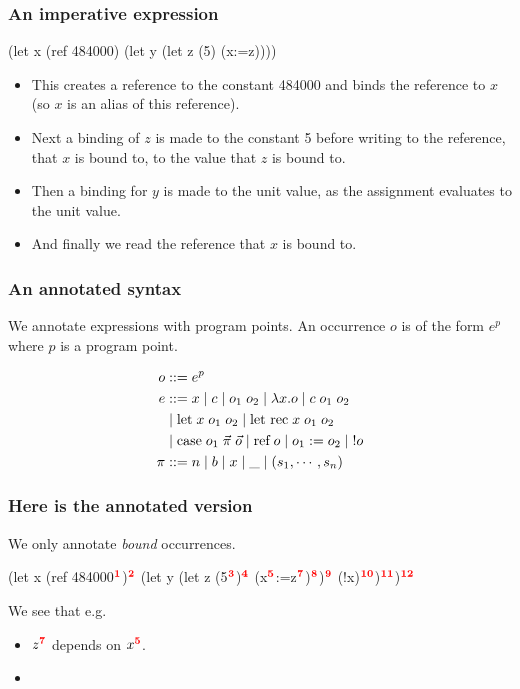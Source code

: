 \documentclass{beamer}
\begin{document}
\begin{frame}[fragile]
  \frametitle{An imperative expression}
  
\begin{rescript}
       (let x (ref 484000)
        (let y (let z (5) (x:=z))))
\end{rescript}

\begin{itemize}
\item<1->This creates a reference to the constant 484000 and binds the reference to
  $x$ (so $x$ is an alias of this reference).
\item<2-> Next a binding of $z$ is made
to the constant 5 before writing to the reference, that $x$ is bound to, 
to the value that $z$ is bound to.
\item<3-> Then a binding for $y$ is made to the unit value,
  as the assignment evaluates to the unit value.
\item<4-> And finally we read the reference that $x$ is bound to.
\end{itemize}

\end{frame}

\begin{frame}
  \frametitle{An annotated syntax}

  We annotate expressions with program points. An occurrence $o$ is of the form $e^p$ where $p$ is a program point.
  
\begin{align*}
o &::= e^p \\
e &::= x \mid c \mid o_1\;o_2 \mid \lambda x.o \mid c \; o_1 \; o_2\\
			& \mid \mbox{let} \; x \; o_1 \; o_2 \mid
                   \mbox{let rec} \; x \; o_1 \; o_2 \\
  & \mid \mbox{case}
                   \; o_1 \; \vec{\pi} \; \vec{o} \mid  \textrm{ref} \; o \mid o_1 := o_2 \mid \; !o\\
\pi &::= n \mid b \mid x \mid \_  \mid
                                (s_1,\cdots,s_n)
\end{align*}

\end{frame}
\begin{frame}[fragile]
  \frametitle{Here is the annotated version}

    We only annotate \emph{bound} occurrences.

  \begin{rescript}
   (let x (ref 484000$\mathbf{\textcolor{red}{^{1}}}$)$\mathbf{\textcolor{red}{^{2}}}$
     (let y (let z (5$\mathbf{\textcolor{red}{^{3}}}$)$\mathbf{\textcolor{red}{^{4}}}$
        (x$\mathbf{\textcolor{red}{^{5}}}$:=z$\mathbf{\textcolor{red}{^{7}}}$)$\mathbf{\textcolor{red}{^{8}}}$)$\mathbf{\textcolor{red}{^{9}}}$ (!x)$\mathbf{\textcolor{red}{^{10}}}$)$\mathbf{\textcolor{red}{^{11}}}$)$\mathbf{\textcolor{red}{^{12}}}$
\end{rescript}

We see that e.g.

\begin{itemize}
\item $z\mathbf{\textcolor{red}{^{7}}}$ depends on $x\mathbf{\textcolor{red}{^{5}}}$.
\item 
\end{itemize}
\end{frame}
\end{document}
